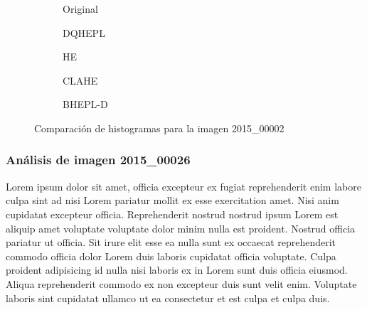 \documentclass[sigchi]{acmart}
\begin{document}
\begin{figure}[H]
    \centering
    \begin{subfigure}[b]{0.45\textwidth}
        \resizebox{\linewidth}{!}{}
        \caption{Original}
        \label{fig:original_1}
    \end{subfigure}
    \hfill
    \begin{subfigure}[b]{0.45\textwidth}
        \resizebox{\linewidth}{!}{}
        \caption{DQHEPL}
        \label{fig:dqhepl_1}
    \end{subfigure}
    
    \vspace{5mm}
    
    \begin{subfigure}[b]{0.45\textwidth}
        \resizebox{\linewidth}{!}{}
        \caption{HE}
        \label{fig:he_1}
    \end{subfigure}
    \hfill
    \begin{subfigure}[b]{0.45\textwidth}
        \resizebox{\linewidth}{!}{}
        \caption{CLAHE}
        \label{fig:clahe_1}
    \end{subfigure}
    
    \vspace{5mm}
    
    \centering
    \begin{subfigure}[b]{0.45\textwidth}
        \resizebox{\linewidth}{!}{}
        \caption{BHEPL-D}
        \label{fig:bhepl_1}
    \end{subfigure}
    
    \caption{Comparación de histogramas para la imagen 2015\_00002}
    \label{fig:histogramas_1}
\end{figure}

\subsubsection{Análisis de imagen 2015\_00026}

Lorem ipsum dolor sit amet, officia excepteur ex fugiat reprehenderit enim labore culpa sint ad
nisi Lorem pariatur mollit ex esse exercitation amet. Nisi anim cupidatat excepteur officia.
Reprehenderit nostrud nostrud ipsum Lorem est aliquip amet voluptate voluptate dolor minim
nulla est proident. Nostrud officia pariatur ut officia. Sit irure elit esse ea nulla sunt ex
occaecat reprehenderit commodo officia dolor Lorem duis laboris cupidatat officia voluptate.
Culpa proident adipisicing id nulla nisi laboris ex in Lorem sunt duis officia eiusmod. Aliqua
reprehenderit commodo ex non excepteur duis sunt velit enim. Voluptate laboris sint cupidatat
ullamco ut ea consectetur et est culpa et culpa duis.
\end{document}
